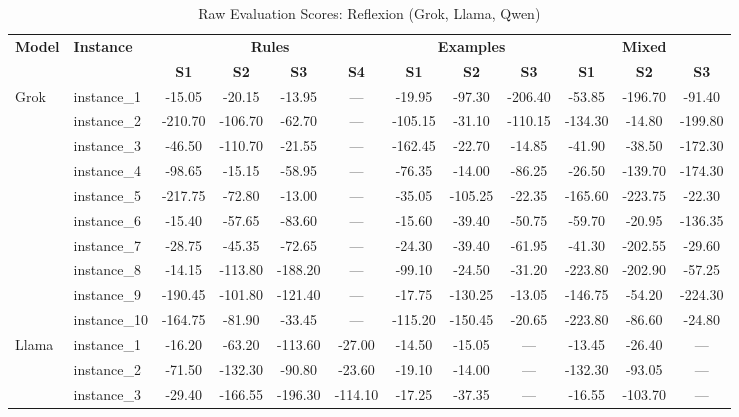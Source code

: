\documentclass[sigconf]{acmart}
\begin{document}
\begin{table}[htbp]
\centering
\scriptsize
\caption{Raw Evaluation Scores: Reflexion (Grok, Llama, Qwen)}
\label{tab:raw-others-indiv}
\begin{tabular}{ll cccc ccc ccc}
\toprule
\textbf{Model} & \textbf{Instance} & \multicolumn{4}{c}{\textbf{Rules}} & \multicolumn{3}{c}{\textbf{Examples}} & \multicolumn{3}{c}{\textbf{Mixed}} \\
\cmidrule(lr){3-6}\cmidrule(lr){7-9}\cmidrule(lr){10-12}
 & & \textbf{S1} & \textbf{S2} & \textbf{S3} & \textbf{S4} & \textbf{S1} & \textbf{S2} & \textbf{S3} & \textbf{S1} & \textbf{S2} & \textbf{S3} \\
\midrule
Grok & instance\_1 & -15.05 & -20.15 & -13.95 & --- & -19.95 & -97.30 & -206.40 & -53.85 & -196.70 & -91.40 \\
 & instance\_2 & -210.70 & -106.70 & -62.70 & --- & -105.15 & -31.10 & -110.15 & -134.30 & -14.80 & -199.80 \\
 & instance\_3 & -46.50 & -110.70 & -21.55 & --- & -162.45 & -22.70 & -14.85 & -41.90 & -38.50 & -172.30 \\
 & instance\_4 & -98.65 & -15.15 & -58.95 & --- & -76.35 & -14.00 & -86.25 & -26.50 & -139.70 & -174.30 \\
 & instance\_5 & -217.75 & -72.80 & -13.00 & --- & -35.05 & -105.25 & -22.35 & -165.60 & -223.75 & -22.30 \\
 & instance\_6 & -15.40 & -57.65 & -83.60 & --- & -15.60 & -39.40 & -50.75 & -59.70 & -20.95 & -136.35 \\
 & instance\_7 & -28.75 & -45.35 & -72.65 & --- & -24.30 & -39.40 & -61.95 & -41.30 & -202.55 & -29.60 \\
 & instance\_8 & -14.15 & -113.80 & -188.20 & --- & -99.10 & -24.50 & -31.20 & -223.80 & -202.90 & -57.25 \\
 & instance\_9 & -190.45 & -101.80 & -121.40 & --- & -17.75 & -130.25 & -13.05 & -146.75 & -54.20 & -224.30 \\
 & instance\_10 & -164.75 & -81.90 & -33.45 & --- & -115.20 & -150.45 & -20.65 & -223.80 & -86.60 & -24.80 \\
\midrule
Llama & instance\_1 & -16.20 & -63.20 & -113.60 & -27.00 & -14.50 & -15.05 & --- & -13.45 & -26.40 & --- \\
 & instance\_2 & -71.50 & -132.30 & -90.80 & -23.60 & -19.10 & -14.00 & --- & -132.30 & -93.05 & --- \\
 & instance\_3 & -29.40 & -166.55 & -196.30 & -114.10 & -17.25 & -37.35 & --- & -16.55 & -103.70 & --- \\

\end{tabular}
\end{table}
\end{document}
